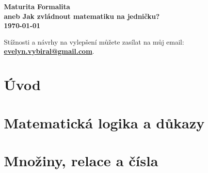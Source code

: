 \documentclass[a4paper, openany]{book}
\newcounter{counter}[section]
\begin{document}
\begin{titlepage}
  \centering
  \vspace*{2cm}
  
  \textbf{\Huge Maturita Formalita}\\[0.5cm]
  
  \textbf{\Large aneb Jak zvládnout matematiku na jedničku?}\\[1.5cm]
  
  \textbf{\Large \today}

  \vfill
  Stížnosti a návrhy na vylepšení můžete zasílat na můj email: \\[0.5cm]
  \textbf{\href{mailto: evelyn.vybiral@gmail.com}{evelyn.vybiral@gmail.com}}.
\end{titlepage}

\thispagestyle{empty}

\setcounter{tocdepth}{1}
\tableofcontents

\chapter*{Úvod}
  



\chapter{Matematická logika a důkazy}


\chapter{Množiny, relace a čísla}

\end{document}
